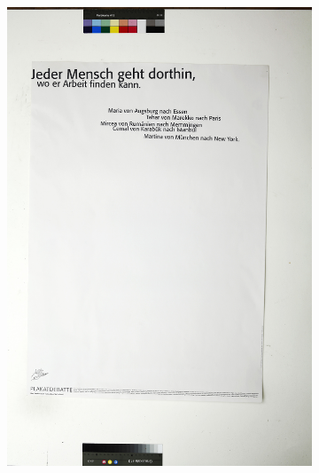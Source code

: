 \documentclass[a4paper,12pt,ngerman]{article}
\begin{document}
\begin{figure}[ht]
\begin{subfigure}[b]{0.5\linewidth}
	\includegraphics[width=\linewidth]{Abbildung_8b_(acht1_080)}
	\end{subfigure}
	\begin{subfigure}[b]{0.5\linewidth}
	\centering

\end{subfigure}
\end{figure}
\end{document}
